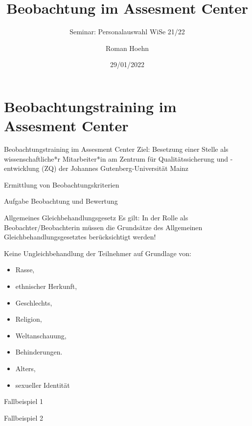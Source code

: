 \documentclass[
  10pt,
  ngerman,
  ignorenonframetext,
]{beamer}
\title{Beobachtung im Assesment Center}
\subtitle{Seminar: Personalauswahl WiSe 21/22}
\author{Roman Hoehn}
\date{29/01/2022}
\providecommand{\tightlist}{%
  \setlength{\itemsep}{0pt}\setlength{\parskip}{0pt}}
\begin{document}
\frame{\titlepage}

\begin{frame}[allowframebreaks]
  \tableofcontents[hideallsubsections]
\end{frame}
\hypertarget{beobachtungstraining-im-assesment-center}{%
\section{Beobachtungstraining im Assesment
Center}\label{beobachtungstraining-im-assesment-center}}

\begin{frame}{Beobachtungstraining im Assesment Center}
Ziel: Besetzung einer Stelle als wissenschaftliche*r Mitarbeiter*in am
Zentrum für Qualitätssicherung und -entwicklung (ZQ) der Johannes
Gutenberg-Universität Mainz
\end{frame}

\begin{frame}{Ermittlung von Beobachtungskriterien}
\protect\hypertarget{ermittlung-von-beobachtungskriterien}{}
\end{frame}

\begin{frame}{Aufgabe}
\protect\hypertarget{aufgabe}{}
Beobachtung und Bewertung
\end{frame}

\begin{frame}{Allgemeines Gleichbehandlungsgesetz}
\protect\hypertarget{allgemeines-gleichbehandlungsgesetz}{}
Es gilt: In der Rolle als Beobachter/Beobachterin müssen die Grundsätze
des Allgemeinen Gleichbehandlungsgesetztes berücksichtigt werden!

Keine Ungleichbehandlung der Teilnehmer auf Grundlage von:

\begin{itemize}
\tightlist
\item
  Rasse,
\item
  ethnischer Herkunft,
\item
  Geschlechts,
\item
  Religion,
\item
  Weltanschauung,
\item
  Behinderungen.
\item
  Alters,
\item
  sexueller Identität
\end{itemize}
\end{frame}

\begin{frame}{Fallbeispiel 1}
\protect\hypertarget{fallbeispiel-1}{}
\end{frame}

\begin{frame}{Fallbeispiel 2}
\protect\hypertarget{fallbeispiel-2}{}
\end{frame}

\begin{frame}{}
\protect\hypertarget{section}{}
\end{frame}
\end{document}
